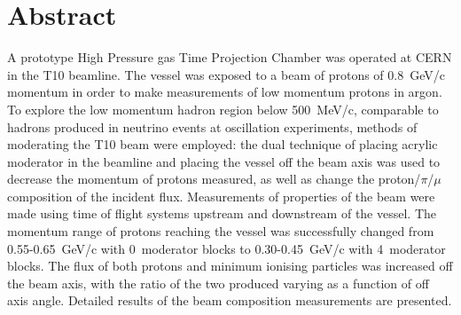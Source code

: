 \section{Abstract}

A prototype High Pressure gas Time Projection Chamber was operated at CERN in the T10 beamline. The vessel was exposed to a beam of protons of 0.8~GeV/c momentum in order to make measurements of low momentum protons in argon.
To explore the low momentum hadron region below 500~MeV/c, comparable to hadrons produced in neutrino events at oscillation experiments, methods of moderating the T10 beam were employed:
the dual technique of placing acrylic moderator in the beamline and placing the vessel off the beam axis was used to decrease the momentum of protons measured, as well as change the proton/$\pi$/$\mu$ composition of the incident flux.
Measurements of properties of the beam were made using time of flight systems upstream and downstream of the vessel. The momentum range of protons reaching the vessel was successfully changed from 0.55-0.65~GeV/c with 0~moderator blocks to 0.30-0.45~GeV/c with 4~moderator blocks.
The flux of both protons and minimum ionising particles was increased off the beam axis, with the ratio of the two produced varying as a function of off axis angle. Detailed results of the beam composition measurements are presented.

